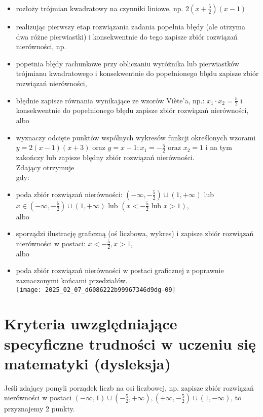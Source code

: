 \documentclass[10pt]{article}
\begin{document}
\begin{itemize}
  \item rozłoży trójmian kwadratowy na czynniki liniowe, np. $2\left(x+\frac{5}{2}\right)(x-1)$
  \item realizując pierwszy etap rozwiązania zadania popełnia błędy (ale otrzyma dwa różne pierwiastki) i konsekwentnie do tego zapisze zbiór rozwiązań nierówności, np.
  \item popetnia błędy rachunkowe przy obliczaniu wyróżnika lub pierwiastków trójmianu kwadratowego i konsekwentnie do popełnionego błędu zapisze zbiór rozwiązań nierówności,
  \item błędnie zapisze równania wynikające ze wzorów Viète'a, np.: $x_{1} \cdot x_{2}=\frac{5}{2}$ i konsekwentnie do popełnionego błędu zapisze zbiór rozwiązań nierówności,\\
albo
  \item wyznaczy odcięte punktów wspólnych wykresów funkcji określonych wzorami $y=2(x-1)(x+3)$ oraz $y=x-1: x_{1}=-\frac{5}{2}$ oraz $x_{2}=1$ i na tym zakończy lub zapisze błędny zbiór rozwiązań nierówności.\\
Zdający otrzymuje\\
gdy:
  \item poda zbiór rozwiązań nierówności: $\left(-\infty,-\frac{5}{2}\right) \cup(1,+\infty)$ lub $x \in\left(-\infty,-\frac{5}{2}\right) \cup(1,+\infty)$ lub $\left(x<-\frac{5}{2}\right.$ lub $\left.x>1\right)$,\\
albo
  \item sporządzi ilustrację graficzną (oś liczbowa, wykres) i zapisze zbiór rozwiązań nierówności w postaci: $x<-\frac{5}{2}, x>1$,\\
albo
  \item poda zbiór rozwiązań nierówności w postaci graficznej z poprawnie zaznaczonymi końcami przedziałów.\\
\texttt{[image: 2025\_02\_07\_d6086222b99967346d9dg-09]}
\end{itemize}

\section*{Kryteria uwzględniające specyficzne trudności w uczeniu się matematyki (dysleksja)}
Jeśli zdający pomyli porządek liczb na osi liczbowej, np. zapisze zbiór rozwiązań nierówności w postaci $(-\infty, 1) \cup\left(-\frac{5}{2},+\infty\right),\left(+\infty,-\frac{5}{2}\right) \cup(1,-\infty)$, to przyznajemy 2 punkty.
\end{document}

